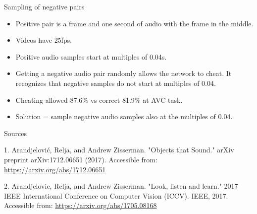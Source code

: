 \documentclass{beamer}
\begin{document}
\begin{frame}{Sampling of negative pairs}

\begin{itemize}
\item Positive pair is a frame and one second of audio with the frame in the middle.
\item Videos have 25fps.
\item Positive audio samples start at multiples of 0.04s.
\item Getting a negative audio pair randomly allows the network to cheat. It recognizes that negative samples do not start at multiples of 0.04.
\item Cheating allowed 87.6\% vs correct 81.9\% at AVC task.
\item Solution = sample negative audio samples also at the multiples of 0.04.
\end{itemize}
 



\end{frame}

\begin{frame}{Sources}

\begin{thebibliography}{0}

   1. Arandjelović, Relja, and Andrew Zisserman. "Objects that Sound." arXiv preprint arXiv:1712.06651 (2017). Accessible from: \url{https://arxiv.org/abs/1712.06651}
  
   2. Arandjelovic, Relja, and Andrew Zisserman. "Look, listen and learn." 2017 IEEE International Conference on Computer Vision (ICCV). IEEE, 2017. Accessible from: \url{https://arxiv.org/abs/1705.08168}
\end{thebibliography}
\end{frame}
 
 
 
\end{document}
